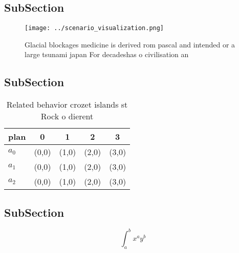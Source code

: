 \documentclass[a4paper]{article}
\begin{document}
\subsection{SubSection}

\begin{figure}
\centering
\texttt{[image: ../scenario\_visualization.png]}
\caption{Glacial blockages medicine is derived rom pascal and intended or a large tsunami japan For decadeshas o civilisation an
}
\end{figure}
 
\subsection{SubSection}

\begin{table}
\begin{adjustbox}{width=0.5\columnwidth}
\begin{tabular}{|l|l|l|l|l|}
\hline
\textbf{plan} & \multicolumn{1}{c|}{\textbf{0}} & \multicolumn{1}{c|}{\textbf{1}} & \multicolumn{1}{c|}{\textbf{2}} & \multicolumn{1}{c|}{\textbf{3}} \\ \hline
\textbf{$a_0$}  & (0,0) & (1,0) & (2,0) & (3,0) \\ \hline
\textbf{$a_1$}  & (0,0) & (1,0) & (2,0) & (3,0) \\ \hline
\textbf{$a_2$}  & (0,0) & (1,0) & (2,0) & (3,0) \\ \hline
\end{tabular}
\end{adjustbox}
\caption{Related behavior crozet islands st Rock o dierent
}
\end{table}

\subsection{SubSection}

\[ \int_{a}^{b}{x^{a}y^{b}} \]
\end{document}

